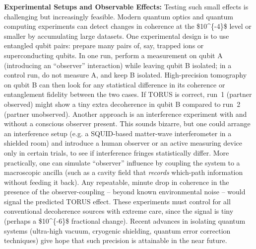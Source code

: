 \documentclass[
]{article}
\begin{document}
{\textbf{Experimental Setups and Observable Effects:} Testing such small
effects is challenging but increasingly feasible. Modern quantum optics
and quantum computing experiments can detect changes in coherence at the
\$10\^{}\{-4\}\$ level or smaller by accumulating large datasets. One
experimental design is to use entangled qubit pairs: prepare many pairs
of, say, trapped ions or superconducting qubits. In one run, perform a
measurement on qubit A (introducing an ``observer'' interaction) while
leaving qubit B isolated; in a control run, do not measure A, and keep B
isolated. High-precision tomography on qubit B can then look for any
statistical difference in its coherence or entanglement fidelity between
the two cases. If TORUS is correct, run~1 (partner observed) might show
a tiny extra decoherence in qubit B compared to run~2 (partner
unobserved\hspace{0pt}). Another approach is an interference experiment
with and without a conscious observer present. This sounds bizarre, but
one could arrange an interference setup (e.g. a SQUID-based matter-wave
interferometer in a shielded room) and introduce a human observer or an
active measuring device only in certain trials, to see if interference
fringes statistically differ\hspace{0pt}. More practically, one can
simulate ``observer'' influence by coupling the system to a macroscopic
ancilla (such as a cavity field that \emph{records} which-path
information without feeding it back)\hspace{0pt}. Any repeatable, minute
drop in coherence in the presence of the observer-coupling -- beyond
known environmental noise -- would signal the predicted TORUS effect.
These experiments must control for all conventional decoherence sources
with extreme care, since the signal is tiny (perhaps a \$10\^{}\{-6\}\$
fractional change\hspace{0pt}). Recent advances in isolating quantum
systems (ultra-high vacuum, cryogenic shielding, quantum error
correction techniques) give hope that such precision is attainable in
the near future.

}
\end{document}
